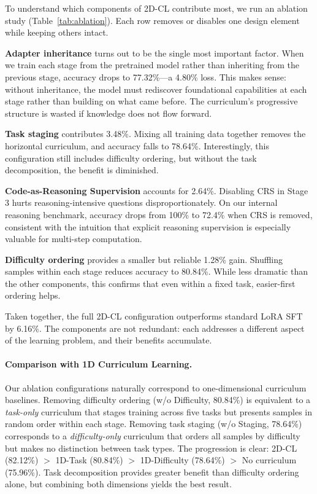 ﻿\documentclass[journal]{IEEEtran}
\newcommand{\method}{2D-CL}
\newcommand{\crs}{CRS}
\begin{document}
To understand which components of \method{} contribute most, we run an ablation study (Table~\ref{tab:ablation}). Each row removes or disables one design element while keeping others intact.

\textbf{Adapter inheritance} turns out to be the single most important factor. When we train each stage from the pretrained model rather than inheriting from the previous stage, accuracy drops to 77.32\%---a 4.80\% loss. This makes sense: without inheritance, the model must rediscover foundational capabilities at each stage rather than building on what came before. The curriculum's progressive structure is wasted if knowledge does not flow forward.

\textbf{Task staging} contributes 3.48\%. Mixing all training data together removes the horizontal curriculum, and accuracy falls to 78.64\%. Interestingly, this configuration still includes difficulty ordering, but without the task decomposition, the benefit is diminished.

\textbf{Code-as-Reasoning Supervision} accounts for 2.64\%. Disabling \crs{} in Stage 3 hurts reasoning-intensive questions disproportionately. On our internal reasoning benchmark, accuracy drops from 100\% to 72.4\% when \crs{} is removed, consistent with the intuition that explicit reasoning supervision is especially valuable for multi-step computation.

\textbf{Difficulty ordering} provides a smaller but reliable 1.28\% gain. Shuffling samples within each stage reduces accuracy to 80.84\%. While less dramatic than the other components, this confirms that even within a fixed task, easier-first ordering helps.

Taken together, the full \method{} configuration outperforms standard LoRA SFT by 6.16\%. The components are not redundant: each addresses a different aspect of the learning problem, and their benefits accumulate.

\paragraph{Comparison with 1D Curriculum Learning.}
Our ablation configurations naturally correspond to one-dimensional curriculum baselines. Removing difficulty ordering (w/o Difficulty, 80.84\%) is equivalent to a \emph{task-only} curriculum that stages training across five tasks but presents samples in random order within each stage. Removing task staging (w/o Staging, 78.64\%) corresponds to a \emph{difficulty-only} curriculum that orders all samples by difficulty but makes no distinction between task types. The progression is clear: 2D-CL (82.12\%) $>$ 1D-Task (80.84\%) $>$ 1D-Difficulty (78.64\%) $>$ No curriculum (75.96\%). Task decomposition provides greater benefit than difficulty ordering alone, but combining both dimensions yields the best result.
\end{document}
